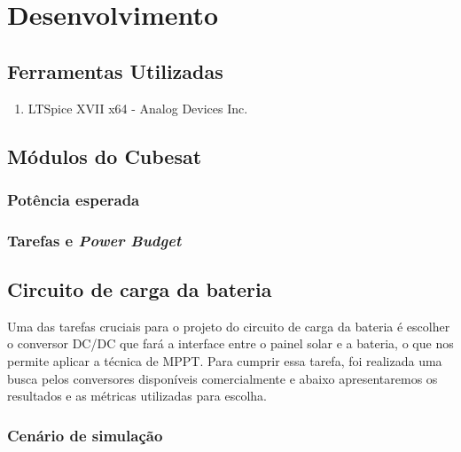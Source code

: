 \chapter{Desenvolvimento} \label{desenvolvimento}

\section{Ferramentas Utilizadas}
\begin{enumerate}
    \item LTSpice XVII x64 - Analog Devices Inc.
\end{enumerate}

\section{Módulos do Cubesat}
\subsection{Potência esperada}
\subsection{Tarefas e \textit{Power Budget}}

\section{Circuito de carga da bateria}

Uma das tarefas cruciais para o projeto do circuito de carga da bateria é escolher o conversor DC/DC que fará a interface entre o painel solar e a bateria, o que nos permite aplicar a técnica de MPPT. Para cumprir essa tarefa, foi realizada uma busca pelos conversores disponíveis comercialmente e abaixo apresentaremos os resultados e as métricas utilizadas para escolha.


    
\subsection{Cenário de simulação}



